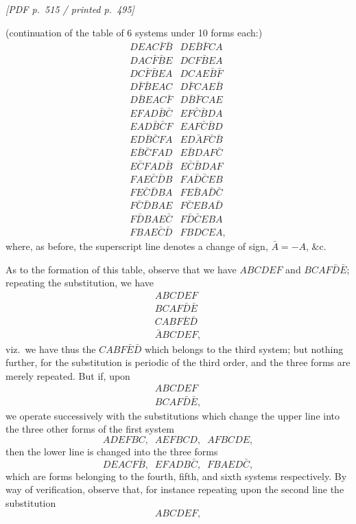 \documentclass[11pt]{article}
\begin{document}
\vfill
\noindent\textit{[PDF p.~515 / printed p.~495]}
\newpage

\noindent (continuation of the table of 6 systems under 10 forms each:)
\[
\begin{array}{l|l}
DEAC\bar{F}\bar{B} & DE\bar{B}\bar{F}CA \\
DAC\bar{F}\bar{B}E & DCF\bar{B}EA \\
DC\bar{F}\bar{B}EA & DCAE\bar{B}\bar{F} \\
D\bar{F}\bar{B}EAC & D\bar{F}CAE\bar{B} \\
D\bar{B}EAC\bar{F} & D\bar{B}\bar{F}CAE \\
\hline
EFAD\bar{B}\bar{C} & EF\bar{C}\bar{B}DA \\
EAD\bar{B}\bar{C}F & EAF\bar{C}\bar{B}D \\
ED\bar{B}\bar{C}FA & ED\bar{A}F\bar{C}\bar{B} \\
E\bar{B}\bar{C}FAD & E\bar{B}DAF\bar{C} \\
E\bar{C}FAD\bar{B} & E\bar{C}\bar{B}DAF \\
\hline
FAE\bar{C}\bar{D}B & FA\bar{D}\bar{C}EB \\
FE\bar{C}\bar{D}BA & FE\bar{B}A\bar{D}\bar{C} \\
F\bar{C}\bar{D}BAE & F\bar{C}EBA\bar{D} \\
F\bar{D}BAE\bar{C} & F\bar{D}\bar{C}EBA \\
FBAE\bar{C}\bar{D} & FBDCEA,
\end{array}
\]
where, as before, the superscript line denotes a change of sign, $\bar{A} = -A$, \&c.

As to the formation of this table, observe that we have $ABCDEF$ and $BCAF\bar{D}\bar{E}$; repeating the substitution, we have
\[
\begin{array}{l}
ABCDEF \\
BCAF\bar{D}\bar{E} \\
CABF\bar{E}\bar{D} \\
\bar{A}BCDEF,
\end{array}
\]
viz.\ we have thus the $CABF\bar{E}\bar{D}$ which belongs to the third system; but nothing further, for the substitution is periodic of the third order, and the three forms are merely repeated. But if, upon
\[
\begin{array}{l}
ABCDEF \\
BCAF\bar{D}\bar{E},
\end{array}
\]
we operate successively with the substitutions which change the upper line into the three other forms of the first system
\[
ADEFBC,\;\;AEFBCD,\;\;AFBCDE,
\]
then the lower line is changed into the three forms
\[
DEACF\bar{B},\;\;EFADB\bar{C},\;\;FBAED\bar{C},
\]
which are forms belonging to the fourth, fifth, and sixth systems respectively. By way of verification, observe that, for instance repeating upon the second line the substitution
\[
ABCDEF,
\]
\end{document}

